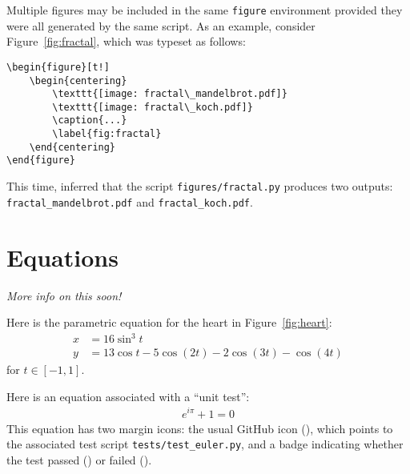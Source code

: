 \documentclass[modern]{aastex62}
\newcommand{\xxx}[1]{\emph{\color{red}#1}}
\begin{document}
Multiple figures may be included in the same \lstinline[style=LaTeX]!figure! environment provided they were all generated by the same script. As an example, consider Figure~\ref{fig:fractal}, which was typeset as follows:
%
\begin{lstlisting}[style=LaTeX]
\begin{figure}[t!]
    \begin{centering}
        \texttt{[image: fractal\_mandelbrot.pdf]}
        \texttt{[image: fractal\_koch.pdf]}
        \caption{...}
        \label{fig:fractal}
    \end{centering}
\end{figure}
\end{lstlisting}
%
This time, \showyourwork inferred that the script \texttt{figures/fractal.py} produces two outputs: \texttt{fractal\_mandelbrot.pdf} and
\texttt{fractal\_koch.pdf}.


\section{Equations}

\xxx{More info on this soon!}

Here is the parametric equation for the heart in Figure~\ref{fig:heart}:
%
\begin{align}
    \label{eq*:heart}
    x & = 16 \sin^3 t                          \nonumber \\
    y & = 13 \cos t - 5 \cos\left(2 t\right) -
    2 \cos\left(3 t\right) - \cos\left(4 t\right)
\end{align}
%
for $t \in [-1, 1]$.

Here is an equation associated with a ``unit test'':
%
\begin{align}
    \label{eq:euler}
    e^{i\pi} + 1 = 0
\end{align}
%
This equation has two margin icons: the usual GitHub icon (\GitHubIcon), which points to the associated test script \texttt{tests/test\_euler.py}, and a badge indicating whether the test passed
(\TestPassIcon) or failed (\TestFailIcon).

\clearpage

\end{document}
